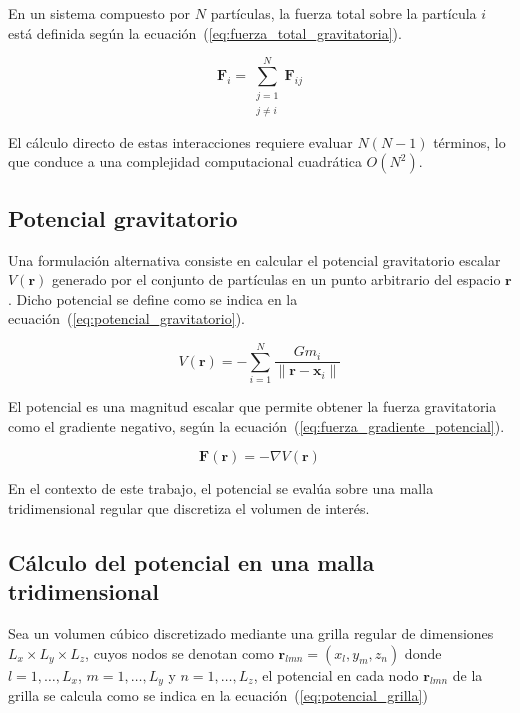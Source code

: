 \documentclass[a4paper,11pt]{book}
\begin{document}
En un sistema compuesto por $N$ partículas, la fuerza total sobre la partícula $i$ está definida según la ecuación~(\ref{eq:fuerza_total_gravitatoria}).

\begin{equation}
	\mathbf{F}_i = \sum_{\substack{j=1 \\ j \neq i}}^{N} \mathbf{F}_{ij}
	\label{eq:fuerza_total_gravitatoria}
\end{equation}

El cálculo directo de estas interacciones requiere evaluar $N(N-1)$ términos, lo que conduce a una complejidad computacional cuadrática $O(N^2)$.

\subsection{Potencial gravitatorio}

Una formulación alternativa consiste en calcular el potencial gravitatorio escalar $V(\mathbf{r})$ generado por el conjunto de partículas en un punto arbitrario del espacio $\mathbf{r}$. Dicho potencial se define como se indica en la ecuación~(\ref{eq:potencial_gravitatorio}).

\begin{equation}
	V(\mathbf{r}) = - \sum_{i=1}^{N} \frac{G m_i}{\|\mathbf{r} - \mathbf{x}_i\|}
	\label{eq:potencial_gravitatorio}
\end{equation}

El potencial es una magnitud escalar que permite obtener la fuerza gravitatoria como el gradiente negativo, según la ecuación~(\ref{eq:fuerza_gradiente_potencial}).

\begin{equation}
	\mathbf{F}(\mathbf{r}) = - \nabla V(\mathbf{r})
	\label{eq:fuerza_gradiente_potencial}
\end{equation}

En el contexto de este trabajo, el potencial se evalúa sobre una malla tridimensional regular que discretiza el volumen de interés.

\subsection{Cálculo del potencial en una malla tridimensional}

Sea un volumen cúbico discretizado mediante una grilla regular de dimensiones $L_x \times L_y \times L_z$, cuyos nodos se denotan como $\mathbf{r}_{lmn} = (x_l, y_m, z_n)$ donde $l = 1, \dots, L_x$, $m = 1, \dots, L_y$ y $n = 1, \dots, L_z$, el potencial en cada nodo $\mathbf{r}_{lmn}$ de la grilla se calcula como se indica en la ecuación~(\ref{eq:potencial_grilla})
\end{document}
